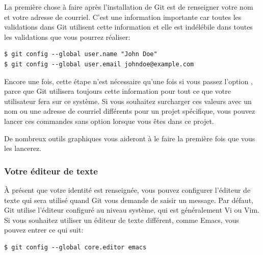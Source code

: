 La première chose à faire après l'installation de Git est de renseigner votre nom et votre adresse de courriel.
C'est une information importante car toutes les validations dans Git utilisent cette information et elle est indélébile dans toutes les validations que vous pourrez réaliser:
\begin{Schunk}
\begin{Verbatim}
$ git config --global user.name "John Doe"
$ git config --global user.email johndoe@example.com
\end{Verbatim}
\end{Schunk}

Encore une fois, cette étape n'est nécessaire qu'une fois si vous passez l'option , parce que Git utilisera toujours cette information pour tout ce que votre utilisateur fera sur ce système.
Si vous souhaitez surcharger ces valeurs avec un nom ou une adresse de courriel différents pour un projet spécifique, vous pouvez lancer ces commandes sans option  lorsque vous êtes dans ce projet.

De nombreux outils graphiques vous aideront à le faire la première fois que vous les lancerez.

\subsubsection{Votre éditeur de texte}

À présent que votre identité est renseignée, vous pouvez configurer l'éditeur de texte qui sera utilisé quand Git vous demande de saisir un message.
Par défaut, Git utilise l'éditeur configuré au niveau système, qui est généralement Vi ou Vim.
Si vous souhaitez utiliser un éditeur de texte différent, comme Emacs, vous pouvez entrer ce qui suit:
\begin{Schunk}
\begin{Verbatim}
$ git config --global core.editor emacs
\end{Verbatim}
\end{Schunk}


